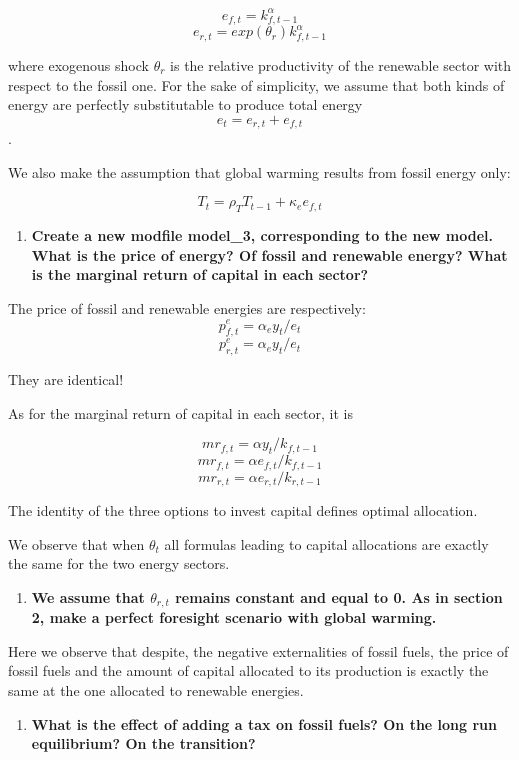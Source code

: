 \documentclass[
  letterpaper,
  DIV=11,
  numbers=noendperiod]{scrartcl}
\providecommand{\tightlist}{%
  \setlength{\itemsep}{0pt}\setlength{\parskip}{0pt}}\usepackage{longtable,booktabs,array}
\begin{document}
\[e_{f,t} = k_{f,t-1}^{\alpha}\]
\[e_{r,t} = exp(\theta_r) k_{f,t-1}^{\alpha}\]

where exogenous shock \(\theta_r\) is the relative productivity of the
renewable sector with respect to the fossil one. For the sake of
simplicity, we assume that both kinds of energy are perfectly
substitutable to produce total energy \[e_t=e_{r,t}+e_{f,t}\].

We also make the assumption that global warming results from fossil
energy only:

\[T_t = \rho_T T_{t-1} +  \kappa_{e}  e_{f,t}\]

\begin{enumerate}
\def\labelenumi{\arabic{enumi}.}
\setcounter{enumi}{11}
\tightlist
\item
  \textbf{Create a new modfile model\_3, corresponding to the new model.
  What is the price of energy? Of fossil and renewable energy? What is
  the marginal return of capital in each sector?}
\end{enumerate}

The price of fossil and renewable energies are respectively:
\[p^e_{f,t} = \alpha_e y_t / e_t\] \[p^e_{r,t} = \alpha_e y_t / e_t\]

They are identical!

As for the marginal return of capital in each sector, it is

\[mr_{f,t} = \alpha y_t / k_{f,t-1}\]
\[mr_{f,t} = \alpha e_{f,t} / k_{f,t-1}\]
\[mr_{r,t} = \alpha e_{r,t} / k_{r,t-1}\]

The identity of the three options to invest capital defines optimal
allocation.

We observe that when \(\theta_t\) all formulas leading to capital
allocations are exactly the same for the two energy sectors.

\begin{enumerate}
\def\labelenumi{\arabic{enumi}.}
\setcounter{enumi}{12}
\tightlist
\item
  \textbf{We assume that \(\theta_{r,t}\) remains constant and equal to
  0. As in section 2, make a perfect foresight scenario with global
  warming.}
\end{enumerate}

Here we observe that despite, the negative externalities of fossil
fuels, the price of fossil fuels and the amount of capital allocated to
its production is exactly the same at the one allocated to renewable
energies.

\begin{enumerate}
\def\labelenumi{\arabic{enumi}.}
\setcounter{enumi}{13}
\tightlist
\item
  \textbf{What is the effect of adding a tax on fossil fuels? On the
  long run equilibrium? On the transition?}
\end{enumerate}
\end{document}
